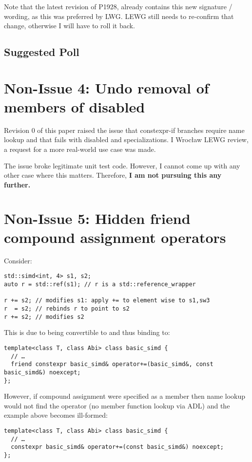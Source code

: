 Note that the latest revision of P1928, already contains this new signature / wording, as this was
preferred by LWG.
LEWG still needs to re-confirm that change, otherwise I will have to roll it back.

\subsection{Suggested Poll}


\section{Non-Issue 4: Undo removal of members of disabled \simd{}}

Revision 0 of this paper raised the issue that constexpr-if branches require name lookup and that
fails with disabled \simd and \mask specializations.
I Wrocław LEWG review, a request for a more real-world use case was made.

The issue broke legitimate  unit test code.
However, I cannot come up with any other case where this matters.
Therefore, \textbf{I am not pursuing this any further.}

\pagebreak
\section{Non-Issue 5: Hidden friend compound assignment operators}
\label{sec:i5}

Consider:\smallskip
\begin{lstlisting}
std::simd<int, 4> s1, s2;
auto r = std::ref(s1); // r is a std::reference_wrapper

r += s2; // modifies s1: apply += to element wise to s1,sw3
r  = s2; // rebinds r to point to s2
r += s2; // modifies s2
\end{lstlisting}

This is due to  being convertible to  and thus binding to:
\smallskip\begin{lstlisting}
template<class T, class Abi> class basic_simd {
  // …
  friend constexpr basic_simd& operator+=(basic_simd&, const basic_simd&) noexcept;
};
\end{lstlisting}

However, if compound assignment were specified as a member then name lookup would not find the
operator (no member function lookup via ADL) and the example above becomes ill-formed:
\smallskip\begin{lstlisting}
template<class T, class Abi> class basic_simd {
  // …
  constexpr basic_simd& operator+=(const basic_simd&) noexcept;
};
\end{lstlisting}

